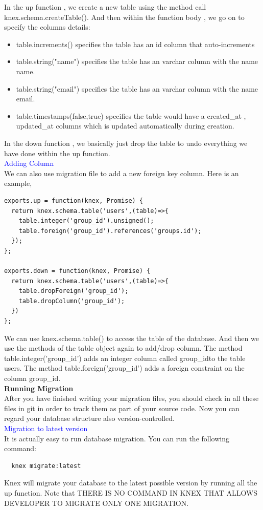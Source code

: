\documentclass[a4paper]{article}
\begin{document}
In the up function , we create a new table using the method call knex.schema.createTable(). And then within the function body , we go on to specify the columns details:
\begin{itemize}
\item table.increments() specifies the table has an id column that auto-increments
\item table.string("name") specifies the table has an varchar column with the name name.
\item table.string("email") specifies the table has an varchar column with the name email.
\item table.timestamps(false,true) specifies the table would have a created_at , updated_at columns which is updated automatically during creation.
\end{itemize}
In the down function , we basically just drop the table to undo everything we have done within the up function.\\

\textcolor{blue}{Adding Column}\\

We can also use migration file to add a new foreign key column. Here is an example,
\begin{lstlisting}
exports.up = function(knex, Promise) {
  return knex.schema.table('users',(table)=>{
    table.integer('group_id').unsigned();
    table.foreign('group_id').references('groups.id');
  });
};

exports.down = function(knex, Promise) {
  return knex.schema.table('users',(table)=>{
    table.dropForeign('group_id');
    table.dropColumn('group_id');
  })
};
\end{lstlisting}
We can use knex.schema.table() to access the table of the database. And then we use the methods of the table object again to add/drop column. The method table.integer('group_id') adds an integer column called group_idto the table users. The method table.foreign('group_id') adds a foreign constraint on the column group_id.\\

\textbf{Running Migration}\\
After you have finished writing your migration files, you should check in all these files in git in order to track them as part of your source code. Now you can regard your database structure also version-controlled.\\

\textcolor{blue}{Migration to latest version}\\
It is actually easy to run database migration. You can run the following command:
\begin{lstlisting}
  knex migrate:latest
\end{lstlisting}
Knex will migrate your database to the latest possible version by running all the up function. Note that THERE IS NO COMMAND IN KNEX THAT ALLOWS DEVELOPER TO MIGRATE ONLY ONE MIGRATION.\\
\end{document}
